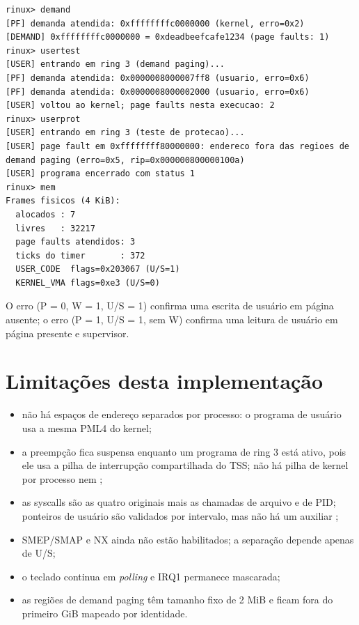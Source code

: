 \begin{lstlisting}[style=shell,caption={Sa\'ida dos comandos de mem\'oria e ring 3.},label={lst:testdemand}]
rinux> demand
[PF] demanda atendida: 0xffffffffc0000000 (kernel, erro=0x2)
[DEMAND] 0xffffffffc0000000 = 0xdeadbeefcafe1234 (page faults: 1)
rinux> usertest
[USER] entrando em ring 3 (demand paging)...
[PF] demanda atendida: 0x0000008000007ff8 (usuario, erro=0x6)
[PF] demanda atendida: 0x0000008000002000 (usuario, erro=0x6)
[USER] voltou ao kernel; page faults nesta execucao: 2
rinux> userprot
[USER] entrando em ring 3 (teste de protecao)...
[USER] page fault em 0xffffffff80000000: endereco fora das regioes de demand paging (erro=0x5, rip=0x000000800000100a)
[USER] programa encerrado com status 1
rinux> mem
Frames fisicos (4 KiB):
  alocados : 7
  livres   : 32217
  page faults atendidos: 3
  ticks do timer       : 372
  USER_CODE  flags=0x203067 (U/S=1)
  KERNEL_VMA flags=0xe3 (U/S=0)
\end{lstlisting}

O erro  (P = 0, W = 1, U/S = 1) confirma uma escrita de usu\'ario em
p\'agina ausente; o erro  (P = 1, U/S = 1, sem W) confirma uma
leitura de usu\'ario em p\'agina presente e supervisor.

\section{Limita\c{c}\~oes desta implementa\c{c}\~ao}

\begin{itemize}
  \item n\~ao h\'a espa\c{c}os de endere\c{c}o separados por processo: o
        programa de usu\'ario usa a mesma PML4 do kernel;
  \item a preemp\c{c}\~ao fica suspensa enquanto um programa de ring 3 est\'a
        ativo, pois ele usa a pilha de interrup\c{c}\~ao compartilhada do TSS;
        n\~ao h\'a pilha de kernel por processo nem ;
  \item as syscalls s\~ao as quatro originais mais as chamadas de arquivo e
        de PID; ponteiros de usu\'ario s\~ao validados por intervalo, mas
        n\~ao h\'a um auxiliar ;
  \item SMEP/SMAP e NX ainda n\~ao est\~ao habilitados; a separa\c{c}\~ao
        depende apenas de U/S;
  \item o teclado continua em \emph{polling} e IRQ1 permanece mascarada;
  \item as regi\~oes de demand paging t\^em tamanho fixo de 2 MiB e ficam
        fora do primeiro GiB mapeado por identidade.
\end{itemize}
